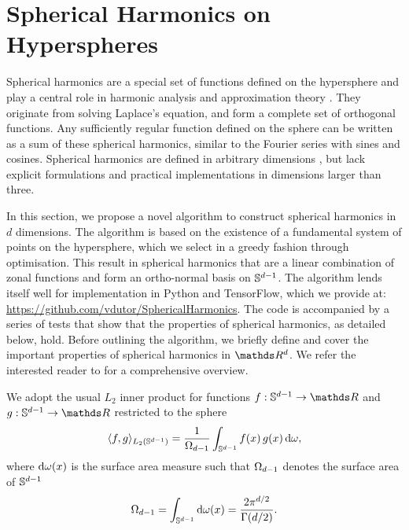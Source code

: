 \chapter{Spherical Harmonics on Hyperspheres} 
\label{appendix:spherical-harmonics}

Spherical harmonics are a special set of functions defined on the hypersphere and play a central role in harmonic analysis and approximation theory \citep{wendland2005}. They originate from solving Laplace's equation, and form a complete set of orthogonal functions. Any sufficiently regular function defined on the sphere can be written as a sum of these spherical harmonics, similar to the Fourier series with sines and cosines. Spherical harmonics are defined in arbitrary dimensions \citep{frye2014,dai2013}, but lack explicit formulations and practical implementations in dimensions larger than three. %

In this section, we propose a novel algorithm to construct spherical harmonics in $d$ dimensions. The algorithm is based on the existence of a fundamental system of points on the hypersphere, which we select in a greedy fashion through optimisation. This result in spherical harmonics that are a linear combination of zonal functions and form an ortho-normal basis on $\mathbb{S}^{d-1}$. The algorithm lends itself well for implementation in Python and TensorFlow, which we provide at: \url{https://github.com/vdutor/SphericalHarmonics}. The code is accompanied by a series of tests that show that the properties of spherical harmonics, as detailed below, hold. Before outlining the algorithm, we briefly define and cover the important properties of spherical harmonics in $\Reals^d$. We refer the interested reader to \citet{dai2013,frye2014} for a comprehensive overview.

We adopt the usual $L_2$ inner product for functions $f: \dsphere \rightarrow \Reals$ and $g: \dsphere \rightarrow \Reals$ restricted to the sphere 
\begin{equation}
     \langle f, g\rangle_{L_{2}(\mathbb{S}^{d-1})} = \frac{1}{\Omega_{d-1}} \int_{\mathbb{S}^{d-1}} f(x)\,g(x) \, \mathrm{d}{\omega},
\end{equation}
where $\mathrm{d}{\omega(x)}$ is the surface area measure such that $\Omega_{d-1}$ denotes the surface area of $\mathbb{S}^{d-1}$ 
\begin{equation}
\label{eq:surface}
    \Omega_{d-1} = \int_{\mathbb{S}^{d-1}} \mathrm{d}{\omega(x)} = \frac{2 \pi ^ {d/2}}{\Gamma(d/2)}.
\end{equation}

